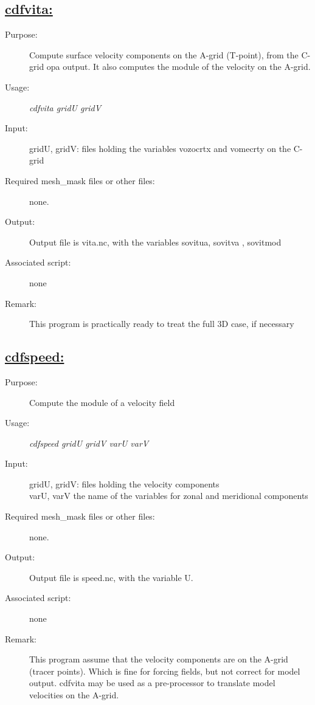\documentclass[a4paper,11pt]{article}
\begin{document}
\newpage
\subsection*{\underline{cdfvita:}}
\begin{description}
\item[Purpose:]  Compute surface velocity components on the A-grid (T-point), from the C-grid opa output. It also computes the
                  module of the velocity on the A-grid.
\item[Usage:] {\em cdfvita gridU gridV }
\item[Input:]  gridU, gridV: files holding the variables vozocrtx and vomecrty on the C-grid
\item[Required mesh\_mask files or other files:] none.
\item[Output:] Output file is vita.nc, with the variables sovitua, sovitva , sovitmod
\item[Associated script:] none
\item[Remark:] This program is practically ready to treat the full 3D case, if necessary
\end{description}

\subsection*{\underline{cdfspeed:}}
\begin{description}
\item[Purpose:] Compute the module of a velocity field
\item[Usage:] {\em cdfspeed gridU gridV varU varV }
\item[Input:]  gridU, gridV: files holding the velocity components \\
       varU, varV the name of the variables for zonal and meridional components
\item[Required mesh\_mask files or other files:] none.
\item[Output:] Output file is speed.nc, with the variable U.
\item[Associated script:] none
\item[Remark:] This program assume that the velocity components are on the A-grid (tracer points). Which is fine for forcing fields, but not correct
 for model output. cdfvita may be used as a pre-processor to translate model velocities on the A-grid.
\end{description}
\end{document}
